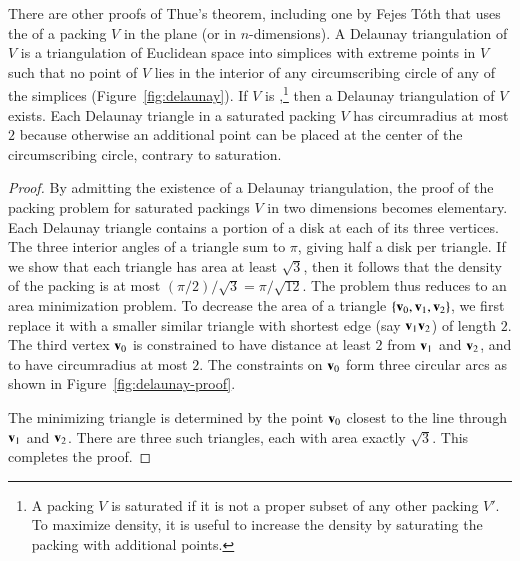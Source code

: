 
\bigskip

%

There are other proofs of Thue's theorem, including one by Fejes
T\'oth that uses the  
of a packing $V$
in the plane (or in $n$-dimensions).  A Delaunay triangulation of $V$
is a triangulation of Euclidean space into simplices with extreme
points in $V$ such that no point of $V$ lies in the interior of any
circumscribing circle of any of the simplices (Figure~\ref{fig:delaunay}).  
If $V$ is
,\footnote{A packing $V$ is saturated if it is not
  a proper subset of any other packing $V'$.  To maximize density, it
  is useful to increase the density by saturating the packing with
  additional points.} then a Delaunay triangulation of
$V$ exists.  Each Delaunay triangle in a saturated packing $V$ has
circumradius at most $2$ because otherwise an additional point can be
placed at the center of the circumscribing circle, contrary to saturation.

\figANNTKZP %

\begin{proof}
  By admitting the existence of a Delaunay triangulation, the proof of
  the packing problem for saturated packings $V$ in two dimensions becomes
  elementary.  Each Delaunay triangle contains a portion of a disk at each of
  its three vertices.  The three interior angles of a triangle sum to
  $\pi$, giving half a disk per triangle.  If we show that each triangle has area
  at least $\sqrt{3}$, then it follows that the density of the packing is at most
  $(\pi/2)/\sqrt{3} = \pi/\sqrt{12}$.  The problem thus reduces to
  an area minimization problem.  To decrease the area of a triangle
  $\{{\mathbf v}_0,{\mathbf v}_1,{\mathbf v}_2\}$, we first replace it with a smaller similar
  triangle with shortest edge (say ${\mathbf v}_1{\mathbf v}_2$) of length $2$.  The
  third vertex ${\mathbf v}_0$ is constrained to have distance at least $2$
  from ${\mathbf v}_1$ and ${\mathbf v}_2$, and to have circumradius at most $2$.  The
  constraints on ${\mathbf v}_0$ form three circular arcs as shown in
  Figure~\ref{fig:delaunay-proof}.

\figCCKQLLH  %


The minimizing triangle is determined by the point ${\mathbf v}_0$ closest to
the line through ${\mathbf v}_1$ and ${\mathbf v}_2$.  There are three such triangles,
each with area exactly $\sqrt3$.  This completes the proof.
\end{proof}

